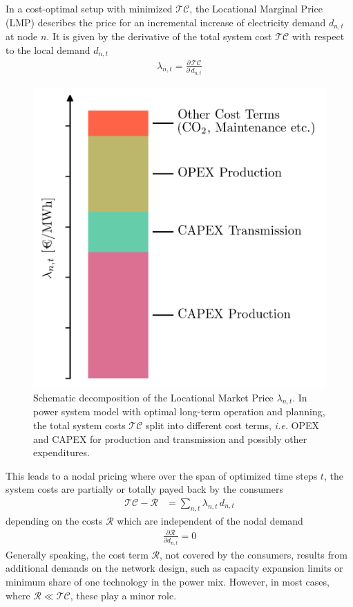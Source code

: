 \documentclass[11pt,twocolumn]{article}
\newcommand{\ie}{\textit{i.e.} }
\newcommand{\pdv}[2]{\frac{\partial #1}{\partial #2}}
\newcommand{\lmp}[1][n]{\lambda_{#1,t}}
\newcommand{\demand}[1][n]{d_{#1,t}}
\newcommand{\totalcost}{\mathcal{TC}}
\newcommand{\remainingcost}{\mathcal{R}}
\begin{document}
In a cost-optimal setup with minimized $\totalcost$, the Locational Marginal Price (LMP) describes the price for an incremental increase of electricity demand $\demand$ at node $n$. It is given by the derivative of the total system cost $\totalcost$ with respect to the local demand $\demand$
\begin{align}
\lmp = \pdv{\,\totalcost}{\,\demand}
\label{eq:lmp}
\end{align}
% 
\begin{figure}[h]
\centering
\includegraphics[width=.8\linewidth]{price_decomposition.png}
\caption{Schematic decomposition of the Locational Market Price $\lmp$. In power system model with optimal long-term operation and planning, the total system costs $\totalcost$ split into different cost terms, \ie OPEX and CAPEX for production and transmission and possibly other expenditures. }
\label{fig:price_decomposition}
\end{figure}
% 
This leads to a nodal pricing where over the span of optimized time steps $t$, the system costs are partially or totally payed back by the consumers 
\begin{align}
\totalcost - \remainingcost &=  \sum_{n,t} \lmp \, \demand
\label{eq:total_revenue}
\end{align}
depending on the costs $\remainingcost$ which are independent of the nodal demand  
\begin{align}
 \pdv{\remainingcost}{\demand} = 0
\end{align}
% 
Generally speaking, the cost term $\remainingcost$, not covered by the consumers, results from additional demands on the network design, such as capacity expansion limits or minimum share of one technology in the power mix. However, in most cases, where $\remainingcost \ll  \totalcost$, these play a minor role. 
\end{document}
